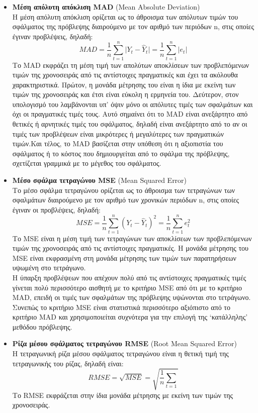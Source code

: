 \begin{itemize}
\item \textbf{Μέση απόλυτη απόκλιση MAD} (Mean Absolute Deviation)\\
Η μέση απόλυτη απόκλιση ορίζεται ως το άθροισμα των απόλυτων τιμών του
σφάλματος της πρόβλεψης διαιρούμενο με τον αριθμό των περιόδων n, στις οποίες
έγιναν προβλέψεις, δηλαδή:\\
$$ MAD= \frac{1}{n} \sum_{t=1}^n \vert Y_t-\widehat{Y}_t \vert =\frac{1}{n} \sum_{t=1}^n \vert e_t \vert $$
Το MAD εκφράζει τη μέση τιμή των απολύτων αποκλίσεων των προβλεπόμενων
τιμών της χρονοσειράς από τις αντίστοιχες πραγματικές και έχει τα ακόλουθα
χαρακτηριστικά. Πρώτον, η μονάδα μέτρησης του είναι η ίδια με εκείνη των τιμών
της χρονοσειράς και έτσι είναι εύκολη η ερμηνεία του. Δεύτερον, στον υπολογισμό
του λαμβάνονται υπ’ όψιν μόνο οι απόλυτες τιμές των σφαλμάτων και όχι οι
πραγματικές τιμές τους. Αυτό σημαίνει ότι το MAD είναι ανεξάρτητο από θετικές ή αρνητικές τιμές του σφάλματος, δηλαδή είναι ανεξάρτητο από το αν οι τιμές των
προβλέψεων είναι μικρότερες ή μεγαλύτερες των
πραγματικών τιμών.Και τέλος, το MAD βασίζεται στην υπόθεση ότι η αξιοπιστία του
σφάλματος ή το κόστος που δημιουργείται από το σφάλμα της πρόβλεψης, σχετίζεται
γραμμικά με το μέγεθος του σφάλματος.

\item \textbf{ Μέσο σφάλμα τετραγώνου MSE} (Mean Squared Error)\\
Το μέσο σφάλμα τετραγώνου ορίζεται ως το άθροισμα των τετραγώνων των
σφαλμάτων διαιρούμενο με τον αριθμό των χρονικών περιόδων n, στις οποίες έγιναν οι
προβλέψεις, δηλαδή:\\
$$ MSE= \frac{1}{n} \sum_{t=1}^n \left( Y_t-\widehat{Y}_t \right)^2 =\frac{1}{n} \sum_{t=1}^n  e_t^2 $$
Το MSE είναι η μέση τιμή των τετραγώνων των αποκλίσεων των προβλεπόμενων
τιμών της χρονοσειράς από τις αντίστοιχες πραγματικές. Η μονάδα μέτρησης του
MSE είναι εκφρασμένη στη μονάδα μέτρησης των τιμών των παρατηρήσεων
υψωμένη στο τετράγωνο.\\
Η ύπαρξη προβλέψεων που απέχουν πολύ από τις αντίστοιχες πραγματικές τιμές
γίνεται πολύ περισσότερο αισθητή με το κριτήριο MSE από ότι με το κριτήριο MAD,
επειδή οι τιμές των σφαλμάτων της πρόβλεψης υψώνονται στο τετράγωνο. Συνεπώς
το κριτήριο MSE είναι στατιστικά περισσότερο αξιόπιστο από το κριτήριο MAD και
χρησιμοποιείται συχνότερα για την επιλογή της ‘κατάλληλης’ μεθόδου πρόβλεψης.

\item \textbf{Ρίζα μέσου
σφάλματος τετραγώνου RMSE} (Root Mean Squared Error)\\
H τετραγωνική ρίζα μέσου
σφάλματος τετραγώνου είναι η
θετική τιμή της τετραγωνικής του ρίζας, δηλαδή είναι:\\
$$ RMSE=\sqrt{MSE}=\sqrt{\frac{1}{n}\sum_{t=1}} $$
Το RMSE εκφράζεται στην ίδια μονάδα μέτρησης με εκείνη των τιμών της
χρονοσειράς.\\



\end{itemize}
